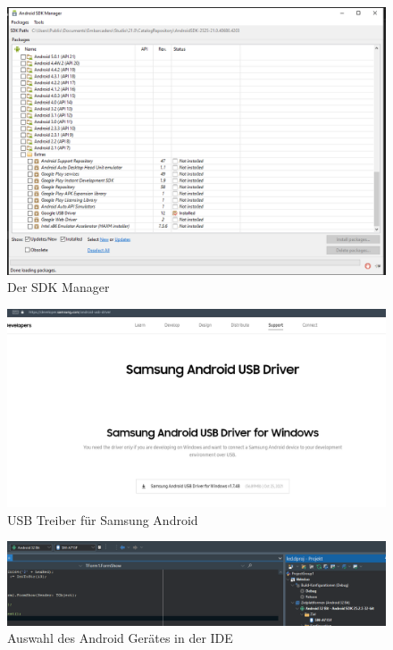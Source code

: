 \begin{figure}[h]
\begin{center}
\includegraphics[width=15cm]{img/sdkmanager.png}
\caption{Der SDK Manager}
\label{sdkmanager}
\end{center}
\end{figure}

\begin{figure}[h]
\begin{center}
\includegraphics[width=15cm]{img/samsungusb.png}
\caption{USB Treiber für Samsung Android}
\label{samsungusb}
\end{center}
\end{figure}

\begin{figure}[h]
\begin{center}
\includegraphics[width=15cm]{img/samsungusb2.png}
\caption{Auswahl des Android Gerätes in der IDE}
\label{samsungusb2}
\end{center}
\end{figure}

